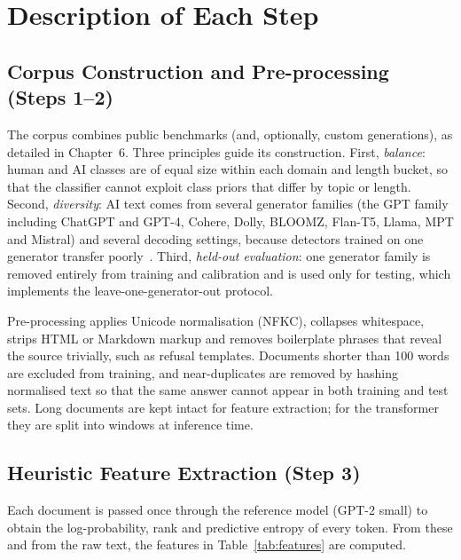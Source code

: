 \section{Description of Each Step}

\subsection{Corpus Construction and Pre-processing (Steps 1--2)}

The corpus combines public benchmarks (and, optionally, custom generations),
as detailed in Chapter~6. Three principles guide its construction. First,
\emph{balance}: human and AI classes are of equal size within each domain and
length bucket, so that the classifier cannot exploit class priors that differ
by topic or length. Second, \emph{diversity}: AI text comes from several
generator families (the GPT family including ChatGPT and GPT-4, Cohere, Dolly,
BLOOMZ, Flan-T5, Llama, MPT and Mistral) and several decoding settings,
because detectors trained on one generator transfer
poorly~\cite{dugan2024raid,wang2024m4}. Third, \emph{held-out evaluation}: one
generator family is removed entirely from training and calibration and is used
only for testing, which implements the leave-one-generator-out protocol.

Pre-processing applies Unicode normalisation (NFKC), collapses whitespace,
strips HTML or Markdown markup and removes boilerplate phrases that reveal the
source trivially, such as refusal templates. Documents shorter than 100 words
are excluded from training, and near-duplicates are removed by hashing
normalised text so that the same answer cannot appear in both training and
test sets. Long documents are kept intact for feature extraction; for the
transformer they are split into windows at inference time.

\subsection{Heuristic Feature Extraction (Step 3)}

Each document is passed once through the reference model (GPT-2 small) to
obtain the log-probability, rank and predictive entropy of every token. From
these and from the raw text, the features in Table~\ref{tab:features} are
computed.

